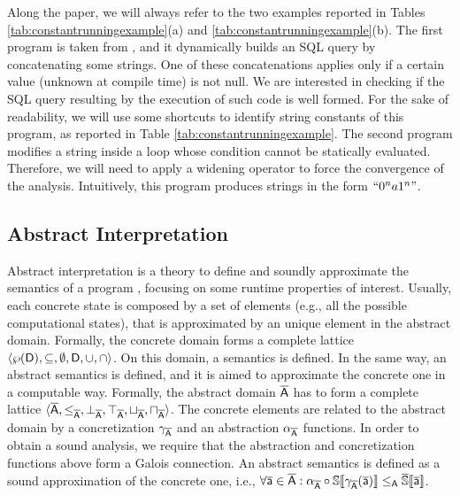 \documentclass[orivec]{llncs}
\begin{document}
Along the paper, we will always refer to the two examples reported in Tables \ref{tab:constantrunningexample}(a) and \ref{tab:constantrunningexample}(b). The first  program is taken from \cite{GOU04}, and it dynamically builds an SQL query by concatenating some strings. One of these concatenations applies only if a certain value (unknown at compile time) is not null. We are interested in checking if the SQL query resulting by the execution of such code is well formed. For the sake of readability, we will use some shortcuts to identify string constants of this program, as reported in Table \ref{tab:constantrunningexample}. The second program modifies a string inside a  loop whose condition cannot be statically evaluated. Therefore, we will need to apply a widening operator \cite{CZ11} to force the convergence of the analysis. Intuitively, this program produces strings in the form $``0^na1^n"$.

 
 
\subsection{Abstract Interpretation}
 
Abstract interpretation is a theory to define and soundly approximate the semantics of a program \cite{CC77,CC79}, focusing on some runtime properties of interest. Usually, each concrete state is composed by a set of elements (e.g., all the possible computational states), that is approximated by an unique element in the abstract domain. Formally, the concrete domain  forms a complete lattice $\langle \wp(\mathsf{D}), \subseteq, \emptyset, \mathsf{D}, \cup, \cap \rangle$. On this domain, a semantics  is defined. In the same way, an abstract semantics is defined, and it is aimed to approximate the concrete one in a computable way. Formally, the abstract domain $\mathsf{\overline{A}}$ has to form a complete lattice $\langle \mathsf{\overline{A}}, \leq_{\mathsf{\overline{A}}}, \bot_{\mathsf{\overline{A}}}, \top_{\mathsf{\overline{A}}}, \sqcup_{\mathsf{\overline{A}}}, \sqcap_{\mathsf{\overline{A}}} \rangle$. The concrete elements are related to the abstract domain by a concretization $\gamma_{\mathsf{\overline{A}}}$ and an abstraction $\alpha_{\mathsf{\overline{A}}}$ functions. In order to obtain a sound analysis, we require that the abstraction and concretization functions above form a Galois connection. An abstract semantics  is defined as a sound approximation of the concrete one, i.e., $\forall \mathsf{\overline{a}} \in \mathsf{\overline{A}} : \alpha_{\mathsf{\overline{A}}} \circ \mathbb{S}\llbracket \mathtt{\gamma_{\mathsf{\overline{A}}}(\mathsf{\overline{a}})} \rrbracket \leq_{\mathsf{A}} \mathbb{\overline{\mathit{\mathbb{S}}}}\llbracket \mathtt{\mathsf{\overline{a}}} \rrbracket$.
\end{document}
